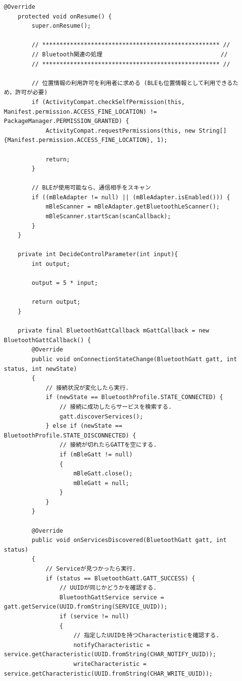 \documentclass[dvipdfmx,autodetect-engine,titlepage]{jsarticle}
\begin{document}
\begin{lstlisting}[caption=Java.py,label=Java]
    @Override
    protected void onResume() {
        super.onResume();

        // *************************************************** //
        // Bluetooth関連の処理                                  //
        // *************************************************** //

        // 位置情報の利用許可を利用者に求める (BLEも位置情報として利用できるため，許可が必要)
        if (ActivityCompat.checkSelfPermission(this, Manifest.permission.ACCESS_FINE_LOCATION) != PackageManager.PERMISSION_GRANTED) {
            ActivityCompat.requestPermissions(this, new String[]{Manifest.permission.ACCESS_FINE_LOCATION}, 1);

            return;
        }

        // BLEが使用可能なら、通信相手をスキャン
        if ((mBleAdapter != null) || (mBleAdapter.isEnabled())) {
            mBleScanner = mBleAdapter.getBluetoothLeScanner();
            mBleScanner.startScan(scanCallback);
        }
    }

    private int DecideControlParameter(int input){
        int output;

        output = 5 * input;

        return output;
    }

    private final BluetoothGattCallback mGattCallback = new BluetoothGattCallback() {
        @Override
        public void onConnectionStateChange(BluetoothGatt gatt, int status, int newState)
        {
            // 接続状況が変化したら実行.
            if (newState == BluetoothProfile.STATE_CONNECTED) {
                // 接続に成功したらサービスを検索する.
                gatt.discoverServices();
            } else if (newState == BluetoothProfile.STATE_DISCONNECTED) {
                // 接続が切れたらGATTを空にする.
                if (mBleGatt != null)
                {
                    mBleGatt.close();
                    mBleGatt = null;
                }
            }
        }

        @Override
        public void onServicesDiscovered(BluetoothGatt gatt, int status)
        {
            // Serviceが見つかったら実行.
            if (status == BluetoothGatt.GATT_SUCCESS) {
                // UUIDが同じかどうかを確認する.
                BluetoothGattService service = gatt.getService(UUID.fromString(SERVICE_UUID));
                if (service != null)
                {
                    // 指定したUUIDを持つCharacteristicを確認する.
                    notifyCharacteristic = service.getCharacteristic(UUID.fromString(CHAR_NOTIFY_UUID));
                    writeCharacteristic = service.getCharacteristic(UUID.fromString(CHAR_WRITE_UUID));


\end{lstlisting}
\end{document}
